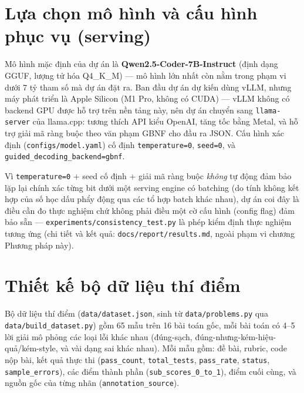 \documentclass[a4paper,12pt]{report}
\begin{document}
\section{Lựa chọn mô hình và cấu hình phục vụ (serving)}

Mô hình mặc định của dự án là \textbf{Qwen2.5-Coder-7B-Instruct} (định
dạng GGUF, lượng tử hóa Q4\_K\_M) — mô hình lớn nhất còn nằm trong phạm vi
dưới 7 tỷ tham số mà dự án đặt ra. Ban đầu dự án dự kiến dùng vLLM, nhưng
máy phát triển là Apple Silicon (M1 Pro, không có CUDA) — vLLM không có
backend GPU được hỗ trợ trên nền tảng này, nên dự án chuyển sang
\texttt{llama-server} của llama.cpp: tương thích API kiểu OpenAI, tăng tốc
bằng Metal, và hỗ trợ giải mã ràng buộc theo văn phạm GBNF cho đầu ra JSON.
Cấu hình xác định (\texttt{configs/model.yaml}) cố định
\texttt{temperature=0}, \texttt{seed=0}, và
\texttt{guided\_decoding\_backend=gbnf}.

Vì \texttt{temperature=0} + seed cố định + giải mã ràng buộc \emph{không}
tự động đảm bảo lặp lại chính xác từng bit dưới một serving engine có
batching (do tính không kết hợp của số học dấu phẩy động qua các tổ hợp
batch khác nhau), dự án coi đây là điều cần đo thực nghiệm chứ không phải
điều một cờ cấu hình (config flag) đảm bảo sẵn —
\texttt{experiments/consistency\_test.py} là phép kiểm định thực nghiệm
tương ứng (chi tiết và kết quả: \texttt{docs/report/results.md}, ngoài
phạm vi chương Phương pháp này).

\section{Thiết kế bộ dữ liệu thí điểm}
\label{sec:pilot-dataset}

Bộ dữ liệu thí điểm (\texttt{data/dataset.json}, sinh từ
\texttt{data/problems.py} qua \texttt{data/build\_dataset.py}) gồm 65 mẫu
trên 16 bài toán gốc, mỗi bài toán có 4--5 lời giải mô phỏng các loại lỗi
khác nhau (đúng-sạch, đúng-nhưng-kém-hiệu-quả/kém-style, và vài dạng sai
khác nhau). Mỗi mẫu gồm: đề bài, rubric, code nộp bài, kết quả thực thi
(\texttt{pass\_count}, \texttt{total\_tests}, \texttt{pass\_rate},
\texttt{status}, \texttt{sample\_errors}), các điểm thành phần
(\texttt{sub\_scores\_0\_to\_1}), điểm cuối cùng, và nguồn gốc của từng
nhãn (\texttt{annotation\_source}).
\end{document}
